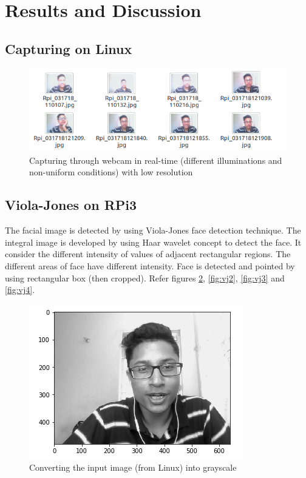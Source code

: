 \section{Results and Discussion}

\subsection{Capturing on Linux}
\begin{figure}[htb]
\centering
\includegraphics[scale=0.7]{images/capture}
\caption{Capturing through webcam in real-time (different illuminations and non-uniform conditions) with low resolution}
\label{fig:capture}
\end{figure}

\subsection{Viola-Jones on RPi3}
The facial image is detected by using Viola-Jones face detection technique. The integral image is developed by using Haar wavelet concept to detect the face. It consider the different intensity of values of adjacent rectangular regions. The different areas of face have different intensity. Face is detected and pointed by using rectangular box (then cropped). Refer figures \ref{fig:vj1}, \ref{fig:vj2}, \ref{fig:vj3} and \ref{fig:vj4}.

\begin{figure}[htb]
\centering
\includegraphics[scale=0.5]{images/vj_img1}
\caption{Converting the input image (from Linux) into grayscale}
\label{fig:vj1}
\end{figure}

